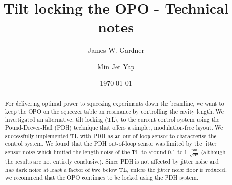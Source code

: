 \documentclass[aps,pra,superscriptaddress,reprint,nofootinbib]{revtex4-1}
\begin{document}
\title{Tilt locking the OPO - Technical notes}

\author{James W. Gardner}

\author{Min Jet Yap}



\date{\today}


\begin{abstract}
For delivering optimal power to squeezing experiments down the beamline, we want to keep the OPO on the squeezer table on resonance by controlling the cavity length. We investigated an alternative, tilt locking (TL), to the current control system using the Pound-Drever-Hall (PDH) technique that offers a simpler, modulation-free layout. We successfully implemented TL with PDH as an out-of-loop sensor to characterise the control system.
We found that the PDH out-of-loop sensor was limited by the jitter sensor noise which limited the length noise of the TL to around 0.1 to 1 $\frac{\mathrm{pm}}{\sqrt{\mathrm{Hz}}}$ (although the results are not entirely conclusive). Since PDH is not affected by jitter noise and has dark noise at least a factor of two below TL, unless the jitter noise floor is reduced, we recommend that the OPO continues to be locked using the PDH system.
\end{abstract}
\end{document}

